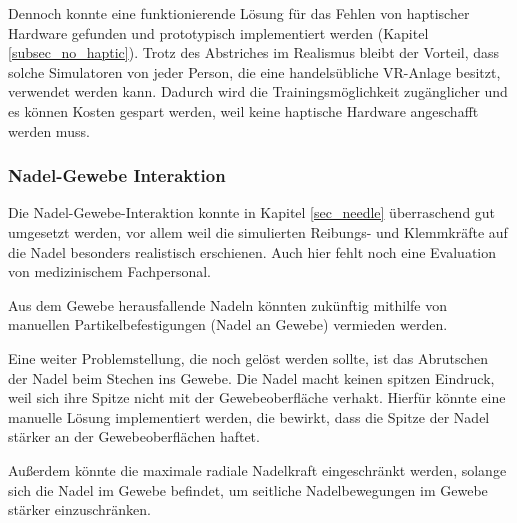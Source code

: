 Dennoch konnte eine funktionierende Lösung für das Fehlen von haptischer Hardware gefunden und prototypisch implementiert werden (Kapitel \ref{subsec_no_haptic}). %
Trotz des Abstriches im Realismus bleibt der Vorteil, dass solche Simulatoren von jeder Person, die eine handelsübliche VR-Anlage besitzt, verwendet werden kann. Dadurch wird die Trainingsmöglichkeit zugänglicher und es können Kosten gespart werden, weil keine haptische Hardware angeschafft werden muss.

\subsubsection{Nadel-Gewebe Interaktion}
Die Nadel-Gewebe-Interaktion konnte in Kapitel \ref{sec_needle} überraschend gut umgesetzt werden, vor allem weil die simulierten Reibungs- und Klemmkräfte auf die Nadel besonders realistisch erschienen. Auch hier fehlt noch eine Evaluation von medizinischem Fachpersonal.

Aus dem Gewebe herausfallende Nadeln könnten zukünftig mithilfe von manuellen Partikelbefestigungen (Nadel an Gewebe) vermieden werden.

Eine weiter Problemstellung, die noch gelöst werden sollte, ist das Abrutschen der Nadel beim Stechen ins Gewebe. Die Nadel macht keinen spitzen Eindruck, weil sich ihre Spitze nicht mit der Gewebeoberfläche verhakt. Hierfür könnte eine manuelle Lösung implementiert werden, die bewirkt, dass die Spitze der Nadel stärker an der Gewebeoberflächen haftet.

Außerdem könnte die maximale radiale Nadelkraft eingeschränkt werden, solange sich die Nadel im Gewebe befindet, um seitliche Nadelbewegungen im Gewebe stärker einzuschränken.









